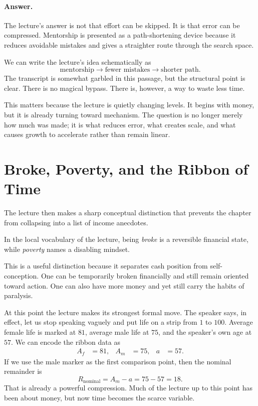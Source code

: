 \paragraph{Answer.} The lecture's answer is not that effort can be skipped. It is that error can be compressed. Mentorship is presented as a path-shortening device because it reduces avoidable mistakes and gives a straighter route through the search space.

We can write the lecture's idea schematically as
\begin{equation}
\text{mentorship} \rightarrow \text{fewer mistakes} \rightarrow \text{shorter path}.
\end{equation}
The transcript is somewhat garbled in this passage, but the structural point is clear. There is no magical bypass. There is, however, a way to waste less time.

This matters because the lecture is quietly changing levels. It begins with money, but it is already turning toward mechanism. The question is no longer merely how much was made; it is what reduces error, what creates scale, and what causes growth to accelerate rather than remain linear.

\section{Broke, Poverty, and the Ribbon of Time}

The lecture then makes a sharp conceptual distinction that prevents the chapter from collapsing into a list of income anecdotes.

\begin{definition}
In the local vocabulary of the lecture, being \emph{broke} is a reversible financial state, while \emph{poverty} names a disabling mindset.
\end{definition}

This is a useful distinction because it separates cash position from self-conception. One can be temporarily broken financially and still remain oriented toward action. One can also have more money and yet still carry the habits of paralysis.

At this point the lecture makes its strongest formal move. The speaker says, in effect, let us stop speaking vaguely and put life on a strip from \(1\) to \(100\). Average female life is marked at \(81\), average male life at \(75\), and the speaker's own age at \(57\). We can encode the ribbon data as
\begin{align}
A_f &= 81, & A_m &= 75, & a &= 57.
\end{align}
If we use the male marker as the first comparison point, then the nominal remainder is
\begin{equation}
R_{\text{nominal}} = A_m - a = 75 - 57 = 18.
\end{equation}
That is already a powerful compression. Much of the lecture up to this point has been about money, but now time becomes the scarce variable.

